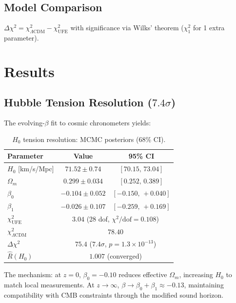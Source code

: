 \documentclass[twocolumn,prd,superscriptaddress,nofootinbib]{revtex4-2}
\begin{document}
\subsection{Model Comparison}

$\Delta\chi^2 = \chi^2_{\Lambda\text{CDM}} - \chi^2_\text{UFE}$ with significance via Wilks' theorem ($\chi^2_1$ for 1 extra parameter).

\section{Results}
\label{sec:results}

\subsection{Hubble Tension Resolution ($7.4\sigma$)}

The evolving-$\beta$ fit to cosmic chronometers yields:

\begin{table}[h]
\caption{$H_0$ tension resolution: MCMC posteriors (68\% CI).}
\label{tab:h0}
\begin{ruledtabular}
\begin{tabular}{lcc}
Parameter & Value & 95\% CI \\
\hline
$H_0$ [km/s/Mpc] & $71.52 \pm 0.74$ & $[70.15,\, 73.04]$ \\
$\Omega_m$ & $0.299 \pm 0.034$ & $[0.252,\, 0.389]$ \\
$\beta_0$ & $-0.104 \pm 0.052$ & $[-0.150,\, +0.040]$ \\
$\beta_1$ & $-0.026 \pm 0.107$ & $[-0.259,\, +0.169]$ \\
\hline
$\chi^2_\text{UFE}$ & \multicolumn{2}{c}{$3.04$ (28 dof, $\chi^2/\text{dof} = 0.108$)} \\
$\chi^2_{\Lambda\text{CDM}}$ & \multicolumn{2}{c}{$78.40$} \\
$\Delta\chi^2$ & \multicolumn{2}{c}{$75.4$ ($7.4\sigma$, $p = 1.3 \times 10^{-13}$)} \\
$\hat{R}(H_0)$ & \multicolumn{2}{c}{$1.007$ (converged)} \\
\end{tabular}
\end{ruledtabular}
\end{table}

The mechanism: at $z = 0$, $\beta_0 = -0.10$ reduces effective $\Omega_m$, increasing $H_0$ to match local measurements. At $z \to \infty$, $\beta \to \beta_0 + \beta_1 \approx -0.13$, maintaining compatibility with CMB constraints through the modified sound horizon.
\end{document}
